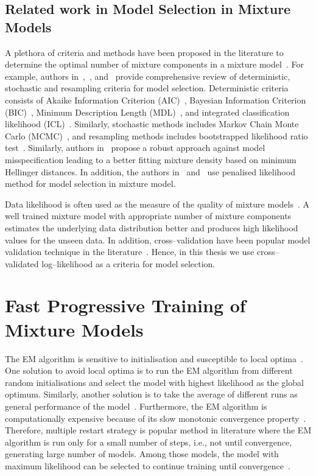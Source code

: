 \subsection*{Related work in Model Selection in Mixture Models}
\label{ss:relatedmxmdl}

A plethora of criteria and methods have been proposed in the literature
to determine the optimal number of mixture components in a mixture 
model~\cite{mclachlanfmm}. For example, authors 
in~\cite{celeux07},~\cite{Figueiredo2002}, and~\cite{oliveira05} 
provide comprehensive 
review of deterministic, stochastic and resampling criteria
for model selection. Deterministic criteria consists of 
Akaike Information Criterion (AIC)~\cite{akaike1973}, Bayesian 
Information Criterion (BIC)~\cite{schwarz78}, Minimum Description
Length (MDL)~\cite{rissanen1978}, and integrated classification 
likelihood (ICL)~\cite{biernacki2000}. Similarly,  stochastic 
methods includes Markov Chain Monte Carlo (MCMC)~\cite{bensmail97},
and resampling methods includes bootstrapped likelihood ratio 
test~\cite{McLachlan1987}. Similarly, authors in~\cite{woo2006}
propose a robust approach against model misspecification leading 
to a better fitting mixture density based on minimum Hellinger 
distances. In addition, the authors in~\cite{chen2008} 
and~\cite{huang2013model} use penalised likelihood method 
for model selection in mixture model.

Data likelihood is often used as 
the measure of the quality of mixture models~\cite{mixmodelcv}.
A well trained mixture model with appropriate number of mixture
components estimates the underlying data distribution better and 
produces high likelihood values for the unseen data. In addition, 
cross--validation have been popular model validation technique
in the literature~\cite{geisser1974,monsteller1968,stone1974}.
Hence, in this thesis we use cross--validated log--likelihood as 
a criteria for model  selection.


\section{Fast Progressive Training of Mixture Models}
\label{s:fast}

The EM algorithm is sensitive to initialisation and susceptible 
to local optima~\cite{McLachlan2008emext,wu1983}. One solution
to avoid local optima is to run the EM algorithm from different 
random initialisations and select the model with highest likelihood 
as the global optimum. Similarly, another solution is to take the 
average of different runs as general performance of the 
model~\cite{tikka2007b}. Furthermore, the  EM algorithm is 
computationally expensive because of its slow monotonic convergence 
property~\cite{McLachlan2008emext}. Therefore, multiple restart 
strategy is popular method in literature where the EM algorithm 
is run only for a small number of steps, i.e., not until 
convergence, generating large number of models. Among those models, 
the model with maximum likelihood can be selected
to continue training until  convergence~\cite{chickering1997}. 


